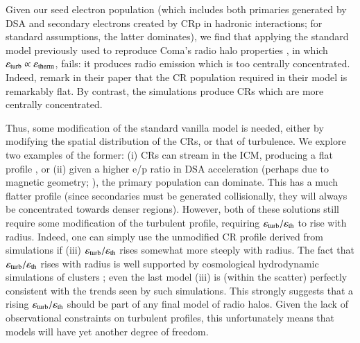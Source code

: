 \documentclass[fleqn,usenatbib,useAMS]{mnras}
\newcommand{\eps}{\varepsilon}
\begin{document}
Given our seed electron population (which includes both primaries generated by DSA and secondary electrons created by CRp in hadronic interactions; for standard assumptions, the latter dominates), we find that applying the standard model previously used to reproduce Coma's radio halo properties \citep{brunetti11}, in which $\eps_{\rm turb} \propto \eps_{\rm therm}$, fails: it produces radio emission which is too centrally concentrated. Indeed, \citet{brunetti11} remark in their paper that the CR population required in their model is remarkably flat. By contrast, the simulations produce CRs which are more centrally concentrated.

Thus, some modification of the standard vanilla model is needed, either by modifying the spatial distribution of the CRs, or that of turbulence. We explore two examples of the former: (i) CRs can stream in the ICM, producing a flat profile \citep{ensslin11,wiener13}, or (ii) given a higher e/p ratio in DSA acceleration (perhaps due to magnetic geometry; \citealt{2014ApJ...794..153G}), the primary population can dominate. This has a much flatter profile (since secondaries must be generated collisionally, they will always be concentrated towards denser regions). However, both of these solutions still require some modification of the turbulent profile, requiring $\eps_{\rm turb}/\eps_{\rm th}$ to rise with radius. Indeed, one can simply use the unmodified CR profile derived from simulations if (iii) $\eps_{\rm turb}/\eps_{\rm th}$ rises somewhat more steeply with radius. The fact that $\eps_{\rm turb}/\eps_{\rm th}$ rises with radius is well supported by cosmological hydrodynamic simulations of clusters \citep{2009ApJ...705.1129L,2010ApJ...725.1452S,vazza11}; even the last model (iii) is (within the scatter) perfectly consistent with the trends seen by such simulations. This strongly suggests that a rising $\eps_{\rm turb}/\eps_{\rm th}$ should be part of any final model of radio halos. Given the lack of observational constraints on turbulent profiles, this unfortunately means that models will have yet another degree of freedom. 
\end{document}
